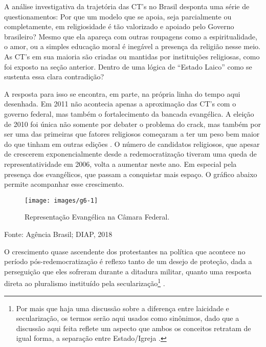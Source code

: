 \documentclass[
	12pt,				%
	oneside,			%
	a4paper,			%
	sumario=tradicional,
	english,			%
	brazil				%
	]{abntex2}
\newcommand{\bcenter}{\begin{center}}
\newcommand{\ecenter}{\end{center}}
\begin{document}
A análise investigativa da trajetória das CT's no Brasil desponta uma série de questionamentos: Por que um modelo que se apoia, seja parcialmente ou completamente, em religiosidade é tão valorizado e apoiado pelo Governo brasileiro? Mesmo que ela apareça com outras roupagens como a espiritualidade, o amor, ou a simples educação moral é inegável a presença da religião nesse meio. As CT's em sua maioria são criadas ou mantidas por instituições religiosas, como foi exposto na seção anterior. Dentro de uma lógica de ``Estado Laico'' como se sustenta essa clara contradição?

A resposta para isso se encontra, em parte, na própria linha do tempo aqui desenhada. Em 2011 não acontecia apenas a aproximação das CT's com o governo federal, mas também o fortalecimento da bancada evangélica. A eleição de 2010 foi única não somente por debater o problema do crack, mas também por ser uma das primeiras que fatores religiosos começaram a ter um peso bem maior do que tinham em outras edições \autocite{pierucci_eleicao_2011,machado_religiao_2012}. O número de candidatos religiosos, que apesar de crescerem exponencialmente desde a redemocratização tiveram uma queda de representatividade em 2006, volta a aumentar neste ano. Em especial pela presença dos evangélicos, que passam a conquistar mais espaço. O gráfico abaixo permite acompanhar esse crescimento.
\begin{figure}[H]

{\centering \texttt{[image: images/g6-1]} 

}

\caption{Representação Evangélica na Câmara Federal.}\label{fig:g6}
\end{figure}
\bcenter

Fonte: Agência Brasil; DIAP, 2018
\ecenter

O crescimento quase ascendente dos protestantes na política que acontece no período pós-redemocratização é reflexo tanto de um desejo de proteção, dada a perseguição que eles sofreram durante a ditadura militar, quanto uma resposta direta ao pluralismo instituído pela secularização\footnote{Por mais que haja uma discussão sobre a diferença entre laicidade e secularização, os termos serão aqui usados como sinônimos, dado que a discussão aqui feita reflete um aspecto que ambos os conceitos retratam de igual forma, a separação entre Estado/Igreja \autocite[246]{mariano_laicidade_2011-1}.} .
\end{document}
